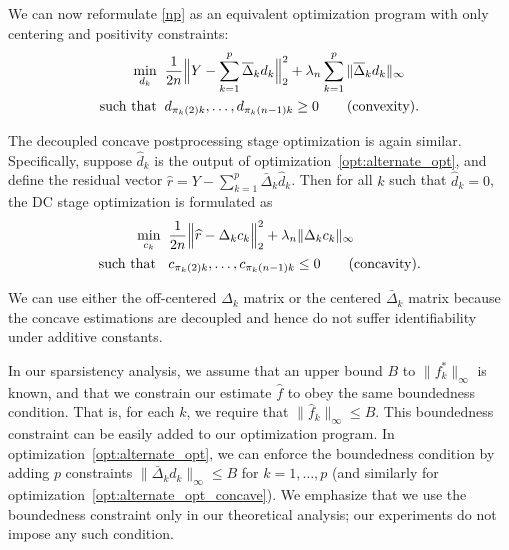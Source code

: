We can now reformulate \eqref{np} as an equivalent optimization program with only centering and positivity constraints:
\begin{align}
\min_{d_k}\;\; & \frac{1}{2n} 
       \Bigl\| Y - \sum_{k=1}^p 
              \overline{\Delta}_k d_k \Bigr\|_2^2 
               + \lambda_n \sum_{k=1}^p \|\overline{\Delta}_k d_k \|_\infty   
     \label{opt:alternate_opt} \\
\textrm{such that}\;\;  & d_{\pi_k(2)k}, \ldots , d_{\pi_k(n-1)k} \geq 0  	
               \qquad \textrm{(convexity).} \nonumber 
\end{align}

The decoupled concave postprocessing stage optimization is again
similar. Specifically, suppose $\hat{d}_k$ is the output of
optimization~\eqref{opt:alternate_opt}, and define the residual vector
$\hat{r} = Y -
\sum_{k=1}^p \bar{\Delta}_k \hat{d}_k$.  Then 
for all $k$ such that $\hat{d}_k = 0$, the DC stage optimization is
formulated as
\begin{align}
  \min_{c_k}\;\; & 
      \frac{1}{2n} \Bigl \| \widehat{r} - \Delta_k c_k \Bigr \|_2^2
      + \lambda_n \| \Delta_k c_k \|_\infty 
      \label{opt:alternate_opt_concave}\\
 \textrm{such that }\;\; & c_{\pi_k(2)k}, \ldots, c_{\pi_k(n-1)k} \leq 0 \qquad \textrm{(concavity).} \nonumber
\end{align}

We can use either the off-centered $\Delta_k$ matrix or the centered
$\bar{\Delta}_k$ matrix because the concave estimations are decoupled
and hence do not suffer identifiability under additive constants.

\begin{remark}
  In our sparsistency analysis, we assume that an upper bound $B$ to
  $\| f^*_k \|_\infty$ is known, and that we constrain our estimate
  $\hat{f}$ to obey the same boundedness condition.  That is, for each
  $k$, we require that $\|\hat{f}_k\|_\infty \leq B$. This boundedness
  constraint can be easily added to our optimization program. In
  optimization~\eqref{opt:alternate_opt}, we can enforce the boundedness
  condition by adding $p$ constraints $\| \bar{\Delta}_k d_k
  \|_\infty \leq B$ for $k=1,\ldots,p$ (and similarly for
  optimization~\eqref{opt:alternate_opt_concave}). We emphasize that we
  use the boundedness constraint only in our theoretical analysis; 
  our experiments do not impose any such condition.
\end{remark}



